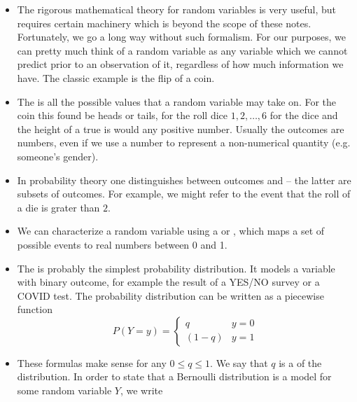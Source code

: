 \begin{itemize}
\item The rigorous mathematical theory for random variables is very useful, but requires certain machinery which is beyond the scope of these notes. Fortunately, we go a long way without such formalism. For our purposes, we can pretty much think of a random variable as any variable which we cannot predict prior to an observation of it, regardless of how much information we have. The classic example is the flip of a coin. 
\item The  is all the possible values that a random variable may take on. For the coin this found be heads or tails, for the roll dice $1,2,\dots,6$ for the dice and the height of a true is would any positive number.  Usually the outcomes are numbers, even if we use a number to represent a non-numerical quantity (e.g. someone's gender).
\item  In probability theory one distinguishes between outcomes and  -- the latter are subsets of outcomes. For example, we might refer to the event that the roll of a die is grater than $2$. 
\item We can characterize a random variable using  a  or , which maps a set of possible events to real numbers between 0 and 1. 
\item  The  is probably the simplest probability distribution. It models a variable with binary outcome, for example the result of a YES/NO survey or a COVID test. 
The probability distribution can be written as a piecewise function 
\begin{equation}\label{eq:pmbern}
P(Y=y) = \left\{\begin{array}{lr} q & y=0\\ (1-q) & y= 1 \end{array}\right.
\end{equation}
\item These formulas make sense for any $0\le q\le1$. We say that $q$ is a  of the distribution. 
In order to state that a Bernoulli distribution is a model for some random variable $Y$, we write
\begin{equation}

\end{equation}
\end{itemize}
